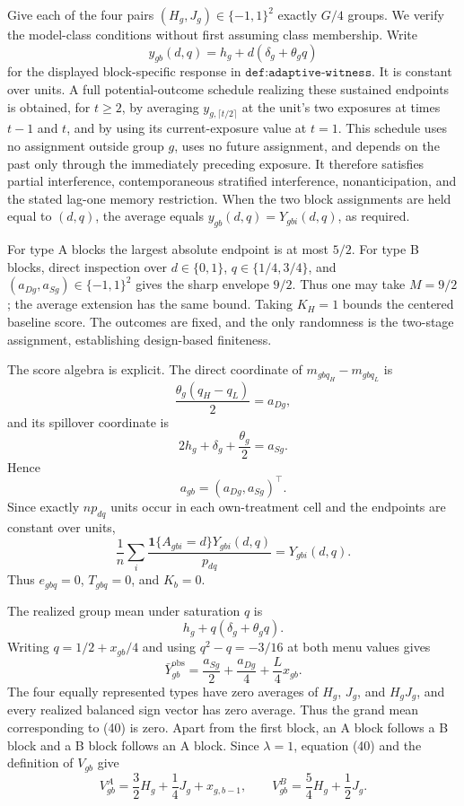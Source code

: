 Give each of the four pairs \((H_g,J_g)\in\{-1,1\}^2\) exactly \(G/4\) groups.  We verify the model-class conditions without first assuming class membership.  Write
\[
 y_{gb}(d,q)=h_g+d(\delta_g+\theta_gq)
\]
for the displayed block-specific response in \(\texttt{def:adaptive-witness}\).  It is constant over units.  A full potential-outcome schedule realizing these sustained endpoints is obtained, for \(t\geq2\), by averaging \(y_{g,\lceil t/2\rceil}\) at the unit's two exposures at times \(t-1\) and \(t\), and by using its current-exposure value at \(t=1\).  This schedule uses no assignment outside group \(g\), uses no future assignment, and depends on the past only through the immediately preceding exposure.  It therefore satisfies partial interference, contemporaneous stratified interference, nonanticipation, and the stated lag-one memory restriction.  When the two block assignments are held equal to \((d,q)\), the average equals \(y_{gb}(d,q)=Y_{gbi}(d,q)\), as required.

For type A blocks the largest absolute endpoint is at most \(5/2\).  For type B blocks, direct inspection over \(d\in\{0,1\}\), \(q\in\{1/4,3/4\}\), and \((a_{Dg},a_{Sg})\in\{-1,1\}^2\) gives the sharp envelope \(9/2\).  Thus one may take \(M=9/2\); the average extension has the same bound.  Taking \(K_H=1\) bounds the centered baseline score.  The outcomes are fixed, and the only randomness is the two-stage assignment, establishing design-based finiteness.

The score algebra is explicit.  The direct coordinate of \(m_{gbq_H}-m_{gbq_L}\) is
\[
 \frac{\theta_g(q_H-q_L)}2=a_{Dg},
\]
and its spillover coordinate is
\[
 2h_g+\delta_g+\frac{\theta_g}{2}=a_{Sg}.
\]
Hence
\[
 a_{gb}=(a_{Dg},a_{Sg})^\top.                               \tag{39}
\]
Since exactly \(np_{dq}\) units occur in each own-treatment cell and the endpoints are constant over units,
\[
 \frac1n\sum_i\frac{\mathbf1\{A_{gbi}=d\}Y_{gbi}(d,q)}{p_{dq}}
 =Y_{gbi}(d,q).
\]
Thus \(e_{gbq}=0\), \(T_{gbq}=0\), and \(K_b=0\).

The realized group mean under saturation \(q\) is
\[
 h_g+q(\delta_g+\theta_gq).
\]
Writing \(q=1/2+x_{gb}/4\) and using \(q^2-q=-3/16\) at both menu values gives
\[
 \bar Y^{\mathrm{obs}}_{gb}
 =\frac{a_{Sg}}2+\frac{a_{Dg}}4+\frac L4x_{gb}.             \tag{40}
\]
The four equally represented types have zero averages of \(H_g\), \(J_g\), and \(H_gJ_g\), and every realized balanced sign vector has zero average.  Thus the grand mean corresponding to (40) is zero.  Apart from the first block, an A block follows a B block and a B block follows an A block.  Since \(\lambda=1\), equation (40) and the definition of \(V_{gb}\) give
\[
 V_{gb}^{A}=\frac32H_g+\frac14J_g+x_{g,b-1},
 \qquad
 V_{gb}^{B}=\frac54H_g+\frac12J_g.                          \tag{41}
\]

